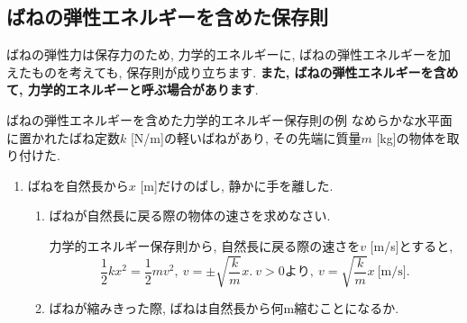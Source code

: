 \documentclass[11pt,dvipdfmx]{jsarticle}
\numberwithin{equation}{section} %
\begin{document}
\subsection{ばねの弾性エネルギーを含めた保存則}
ばねの弾性力は保存力のため, 力学的エネルギーに, ばねの弾性エネルギーを加えたものを考えても, 保存則が成り立ちます. \textbf{また, ばねの弾性エネルギーを含めて, 力学的エネルギーと呼ぶ場合があります}. 
\begin{exbox}{ばねの弾性エネルギーを含めた力学的エネルギー保存則の例}
    なめらかな水平面に置かれたばね定数$k$ [N/m]の軽いばねがあり, その先端に質量$m$ [kg]の物体を取り付けた.
    \begin{center}
    \end{center}
    \begin{enumerate}
        \item ばねを自然長から$x$ [m]だけのばし, 静かに手を離した. 
        \begin{enumerate}
        \item ばねが自然長に戻る際の物体の速さを求めなさい.
         
        力学的エネルギー保存則から, 自然長に戻る際の速さを$v$ [m/s]とすると, 
        \begin{equation}
            \frac{1}{2}kx^2 = \frac{1}{2}mv^2,\  v = \pm\sqrt{\frac{k}{m}}x.\ v > 0より,\ v = \sqrt{\frac{k}{m}}x \ \text{[m/s]}.
        \end{equation}
        \item ばねが縮みきった際, ばねは自然長から何m縮むことになるか. 
        

\end{enumerate}
\end{enumerate}
\end{exbox}
\end{document}
